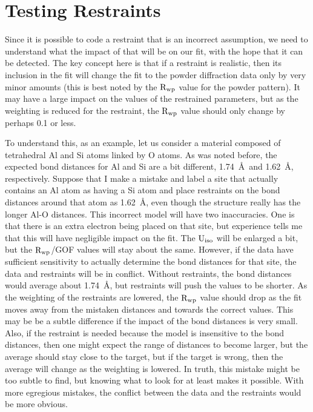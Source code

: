 \section{Testing Restraints}\label{ref:testrestraints}
Since it is possible to code a restraint that is an incorrect assumption, we need to understand what the impact of that will be on our fit, with the hope that it can be detected. The key concept here is that if a restraint is realistic, then its inclusion in the fit will change the fit to the powder diffraction data only by very minor amounts (this is best noted by the $\rm R_{wp}$ value for the powder pattern). It may have a large impact on the values of the restrained parameters, but as the weighting is reduced for the restraint, the $\rm R_{wp}$ value should only change by perhaps 0.1 or less.  

To understand this, as an example, let us consider a material composed of tetrahedral Al and Si atoms linked by O atoms. As was noted before, the expected bond distances for Al and Si are a bit different, 1.74~\AA\  and 1.62~\AA, respectively. Suppose that I make a mistake and label a site that actually contains an Al atom as having a Si atom and place restraints on the bond distances around that atom as 1.62~\AA, even though the structure really has the longer Al-O distances. This incorrect model will have two inaccuracies. One is that there is an extra electron being placed on that site, but experience tells me that this will have negligible impact on the fit. The $\rm U_{iso}$ will be enlarged a bit, but the $\rm R_{wp}$/GOF values will stay about the same. However, if the data have sufficient sensitivity to actually determine the bond distances for that site, the data and restraints will be in conflict. Without restraints, the bond distances would average about 1.74~\AA, but restraints will push the values to be shorter. As the weighting of the restraints are lowered, the $\rm R_{wp}$ value should drop as the fit moves away from the mistaken distances and towards the correct values. This may be be a subtle difference if the impact of the bond distances is very small. Also, if the restraint is needed because the model is insensitive to the bond distances, then one might expect the range of distances to become larger, but the average should stay close to the target, but if the target is wrong, then the average will change as the weighting is lowered. In truth, this mistake might be too subtle to find, but knowing what to look for at least makes it possible. With more egregious mistakes, the conflict between the data and the restraints would be more obvious. 


